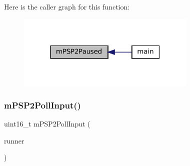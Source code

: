 Here is the caller graph for this function\+:
\nopagebreak
\begin{figure}[H]
\begin{center}
\leavevmode
\includegraphics[width=243pt]{psp2-context_8c_a7f9c754e1ebf551ba6e39e76d7135f91_icgraph}
\end{center}
\end{figure}
\mbox{\label{psp2-context_8c_a29b280976db23268da118020f60ce728}} 
\subsubsection{\texorpdfstring{m\+P\+S\+P2\+Poll\+Input()}{mPSP2PollInput()}}
{\footnotesize\ttfamily uint16\+\_\+t m\+P\+S\+P2\+Poll\+Input (\begin{DoxyParamCaption}\item[{struct \mbox{\hyperlink{structm_g_u_i_runner}{m\+G\+U\+I\+Runner}} $\ast$}]{runner }\end{DoxyParamCaption})}

